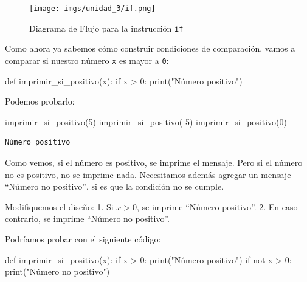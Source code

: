 \documentclass[
  letterpaper,
  DIV=11,
  numbers=noendperiod]{scrreprt}
\newenvironment{Shaded}{\begin{snugshade}}{\end{snugshade}}
\newcommand{\BuiltInTok}[1]{\textcolor[rgb]{0.00,0.23,0.31}{#1}}
\newcommand{\ControlFlowTok}[1]{\textcolor[rgb]{0.00,0.23,0.31}{#1}}
\newcommand{\DecValTok}[1]{\textcolor[rgb]{0.68,0.00,0.00}{#1}}
\newcommand{\KeywordTok}[1]{\textcolor[rgb]{0.00,0.23,0.31}{#1}}
\newcommand{\NormalTok}[1]{\textcolor[rgb]{0.00,0.23,0.31}{#1}}
\newcommand{\OperatorTok}[1]{\textcolor[rgb]{0.37,0.37,0.37}{#1}}
\newcommand{\StringTok}[1]{\textcolor[rgb]{0.13,0.47,0.30}{#1}}
\begin{document}
\begin{figure}[H]

{\centering \texttt{[image: imgs/unidad\_3/if.png]}

}

\caption{Diagrama de Flujo para la instrucción \texttt{if}}

\end{figure}%

Como ahora ya sabemos cómo construir condiciones de comparación, vamos a
comparar si nuestro número \texttt{x} es mayor a \texttt{0}:

\begin{Shaded}
\begin{Highlighting}[]
\KeywordTok{def}\NormalTok{ imprimir\_si\_positivo(x):}
  \ControlFlowTok{if}\NormalTok{ x }\OperatorTok{\textgreater{}} \DecValTok{0}\NormalTok{:}
      \BuiltInTok{print}\NormalTok{(}\StringTok{"Número positivo"}\NormalTok{)}
\end{Highlighting}
\end{Shaded}

Podemos probarlo:

\begin{Shaded}
\begin{Highlighting}[]
\NormalTok{imprimir\_si\_positivo(}\DecValTok{5}\NormalTok{)}
\NormalTok{imprimir\_si\_positivo(}\OperatorTok{{-}}\DecValTok{5}\NormalTok{)}
\NormalTok{imprimir\_si\_positivo(}\DecValTok{0}\NormalTok{)}
\end{Highlighting}
\end{Shaded}

\begin{verbatim}
Número positivo
\end{verbatim}

Como vemos, si el número es positivo, se imprime el mensaje. Pero si el
número no es positivo, no se imprime nada. Necesitamos además agregar un
mensaje ``Número no positivo'', si es que la condición no se cumple.

Modifiquemos el diseño: 1. Si \(x>0\), se imprime ``Número positivo''.
2. En caso contrario, se imprime ``Número no positivo''.

Podríamos probar con el siguiente código:

\begin{Shaded}
\begin{Highlighting}[]
\KeywordTok{def}\NormalTok{ imprimir\_si\_positivo(x):}
  \ControlFlowTok{if}\NormalTok{ x }\OperatorTok{\textgreater{}} \DecValTok{0}\NormalTok{:}
      \BuiltInTok{print}\NormalTok{(}\StringTok{"Número positivo"}\NormalTok{)}
  \ControlFlowTok{if} \KeywordTok{not}\NormalTok{ x }\OperatorTok{\textgreater{}} \DecValTok{0}\NormalTok{:}
      \BuiltInTok{print}\NormalTok{(}\StringTok{"Número no positivo"}\NormalTok{)}
\end{Highlighting}
\end{Shaded}
\end{document}
